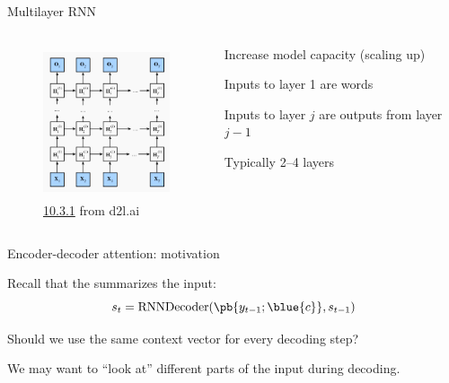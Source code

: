 \documentclass[usenames,dvipsnames,notes,11pt,aspectratio=169,hyperref={colorlinks=true, linkcolor=blue}]{beamer}
\begin{document}
\begin{frame}
    {Multilayer RNN}
    \begin{columns}
        \begin{column}{0.5\textwidth}
    \begin{figure}
        \includegraphics[height=4.5cm]{figures/multi-rnn}
        \caption{\href{https://d2l.ai/chapter_recurrent-modern/deep-rnn.html}{10.3.1} from {d2l.ai}}
    \end{figure}
        \end{column}
        \begin{column}{0.5\textwidth}
            \begin{wideitemize}
                \item Increase model capacity (scaling up) 
                \item Inputs to layer 1 are words
                \item Inputs to layer $j$ are outputs from layer $j-1$
                \item Typically 2--4 layers
            \end{wideitemize}
        \end{column}
    \end{columns}
\end{frame}

\begin{frame}
    {Encoder-decoder attention: motivation}

    Recall that the  summarizes the input:
    $$
    {s_t} = \mathrm{RNNDecoder}(\pb{y_{t-1};\blue{c}}, {s_{t-1}})
    $$

    Should we use the same context vector for every decoding step?

    \pause

    We may want to ``look at'' different parts of the input during decoding.

\end{frame}
\end{document}
